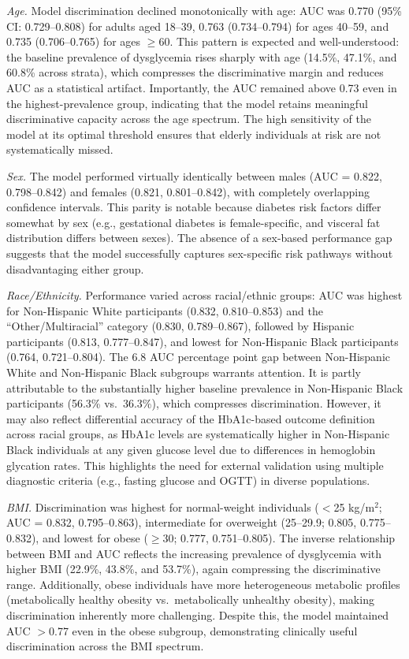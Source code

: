 \documentclass{amia}
\begin{document}
\textit{Age.} Model discrimination declined monotonically with age: AUC was 0.770 (95\% CI: 0.729--0.808) for adults aged 18--39, 0.763 (0.734--0.794) for ages 40--59, and 0.735 (0.706--0.765) for ages $\geq$60. This pattern is expected and well-understood: the baseline prevalence of dysglycemia rises sharply with age (14.5\%, 47.1\%, and 60.8\% across strata), which compresses the discriminative margin and reduces AUC as a statistical artifact. Importantly, the AUC remained above 0.73 even in the highest-prevalence group, indicating that the model retains meaningful discriminative capacity across the age spectrum. The high sensitivity of the model at its optimal threshold ensures that elderly individuals at risk are not systematically missed.

\textit{Sex.} The model performed virtually identically between males (AUC = 0.822, 0.798--0.842) and females (0.821, 0.801--0.842), with completely overlapping confidence intervals. This parity is notable because diabetes risk factors differ somewhat by sex (e.g., gestational diabetes is female-specific, and visceral fat distribution differs between sexes). The absence of a sex-based performance gap suggests that the model successfully captures sex-specific risk pathways without disadvantaging either group.

\textit{Race/Ethnicity.} Performance varied across racial/ethnic groups: AUC was highest for Non-Hispanic White participants (0.832, 0.810--0.853) and the ``Other/Multiracial'' category (0.830, 0.789--0.867), followed by Hispanic participants (0.813, 0.777--0.847), and lowest for Non-Hispanic Black participants (0.764, 0.721--0.804). The 6.8 AUC percentage point gap between Non-Hispanic White and Non-Hispanic Black subgroups warrants attention. It is partly attributable to the substantially higher baseline prevalence in Non-Hispanic Black participants (56.3\% vs.\ 36.3\%), which compresses discrimination. However, it may also reflect differential accuracy of the HbA1c-based outcome definition across racial groups, as HbA1c levels are systematically higher in Non-Hispanic Black individuals at any given glucose level due to differences in hemoglobin glycation rates.\cite{apa2024} This highlights the need for external validation using multiple diagnostic criteria (e.g., fasting glucose and OGTT) in diverse populations.

\textit{BMI.} Discrimination was highest for normal-weight individuals ($<$25 kg/m$^2$; AUC = 0.832, 0.795--0.863), intermediate for overweight (25--29.9; 0.805, 0.775--0.832), and lowest for obese ($\geq$30; 0.777, 0.751--0.805). The inverse relationship between BMI and AUC reflects the increasing prevalence of dysglycemia with higher BMI (22.9\%, 43.8\%, and 53.7\%), again compressing the discriminative range. Additionally, obese individuals have more heterogeneous metabolic profiles (metabolically healthy obesity vs.\ metabolically unhealthy obesity), making discrimination inherently more challenging. Despite this, the model maintained AUC $>$0.77 even in the obese subgroup, demonstrating clinically useful discrimination across the BMI spectrum.
\end{document}
